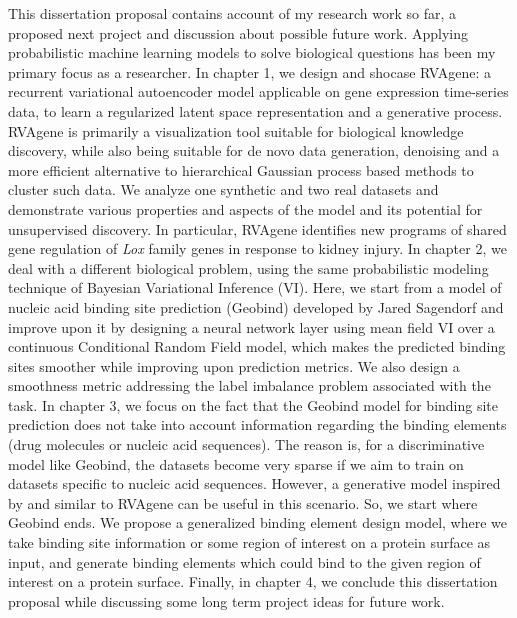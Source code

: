 This dissertation proposal contains account of my research work so far, a proposed next project and discussion about possible future work.
Applying probabilistic machine learning models to solve biological questions has been my primary focus as a researcher. 
In chapter 1, we design and shocase RVAgene: a recurrent variational
autoencoder model applicable on gene expression time-series data, to learn a regularized latent
space representation and a generative process. RVAgene is primarily a visualization tool suitable for biological 
knowledge discovery, while also being suitable for de novo data generation, denoising and a more
efficient alternative to hierarchical Gaussian process based methods to cluster such data. We
analyze one synthetic and two real datasets and demonstrate various properties and aspects of the
model and its potential for unsupervised discovery.  In particular, RVAgene identifies new programs of 
shared gene regulation of \textit{Lox} family genes in response to kidney injury. In
chapter 2, we deal with a different biological problem, using the same probabilistic modeling
technique of Bayesian Variational Inference (VI). Here, we start from a model of nucleic acid binding site
prediction (Geobind) developed by Jared Sagendorf and improve upon it by designing a neural network layer using mean field
VI over a continuous Conditional Random Field model, which makes the predicted binding sites
smoother while improving upon prediction metrics. We also design a smoothness metric
addressing the label imbalance problem associated with the task. In chapter 3, we focus on the fact that the Geobind
model for binding site prediction does not take into account information regarding the binding
elements (drug molecules or nucleic acid sequences). The reason is, for a discriminative model like
Geobind, the datasets become very sparse if we aim to train on datasets specific to nucleic acid
sequences. However, a generative model inspired by and similar to RVAgene can be useful in this
scenario. So, we start where Geobind ends. We propose a generalized binding element design model, where we take binding site
information or some region of interest on a protein surface as input, and generate binding elements which
could bind to the given region of interest on a protein surface. Finally, in chapter 4, we conclude
this dissertation proposal while discussing some long term project ideas for future work.
